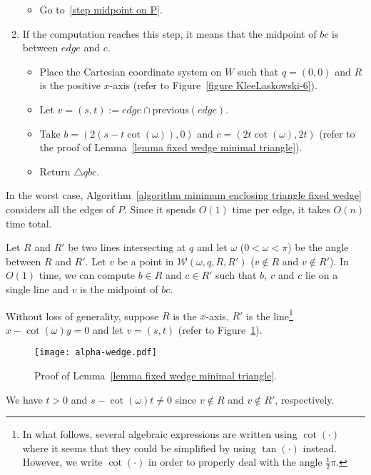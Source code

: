 \documentclass[11pt, oneside]{article}
\def\wedge{\mathcal{W}}
\begin{document}
\begin{algorithm}
\begin{enumerate}
\begin{itemize}
\item Go to~\ref{step midpoint on P}.
\end{itemize}

\item If the computation reaches this step,
it means that the midpoint of $bc$ is between $edge$ and $c$.
\begin{itemize}
\item Place the Cartesian coordinate system on $W$
such that $q = (0,0)$
and $R$ is the positive $x$-axis
(refer to Figure~\ref{figure KleeLaskowski-6}).

\item Let $v=(s,t):=edge \cap \textrm{previous}(edge)$.

\item Take $b=(2(s-t\cot(\omega)),0)$ and $c=(2t\cot(\omega),2t)$
(refer to the proof of Lemma~\ref{lemma fixed wedge minimal triangle}).

\item Return $\triangle qbc$.
\end{itemize}
\end{enumerate}
\end{algorithm}
In the worst case,
Algorithm~\ref{algorithm minimum enclosing triangle fixed wedge} considers all the edges of $P$.
Since it spends $O(1)$ time per edge,
it takes $O(n)$ time total.

\begin{lemma}
\label{lemma fixed wedge minimal triangle}
Let $R$ and $R'$ be two lines
intersecting at $q$
and let $\omega$ ($0<\omega<\pi$)
be the angle between $R$ and $R'$.
Let $v$ be a point in $\wedge(\omega,q,R,R')$
($v\not\in R$ and $v\not\in R'$).
In $O(1)$ time,
we can compute $b\in R$
and $c\in R'$ such that
$b$, $v$ and $c$ lie on a single line
and $v$ is the midpoint of $bc$.
\end{lemma}

\proof
Without loss of generality,
suppose $R$ is the $x$-axis,
$R'$ is the line\footnote{
In what follows,
several algebraic expressions are written using $\cot(\cdot)$
where it seems that they could be simplified by using $\tan(\cdot)$ instead.
However,
we write $\cot(\cdot)$ in order to 
properly deal with the angle $\frac{1}{2}\pi$.} 
$x-\cot(\omega)y=0$
and let $v = (s,t)$
(refer to Figure~\ref{fig alpha-wedge}).
\begin{figure}
\centering
\texttt{[image: alpha-wedge.pdf]}
\caption{Proof of Lemma~\ref{lemma fixed wedge minimal triangle}.\label{fig alpha-wedge}}
\end{figure}
We have $t>0$ and $s-\cot(\omega)t\neq 0$
since $v\not\in R$ and $v\not\in R'$,
respectively.
\end{document}
